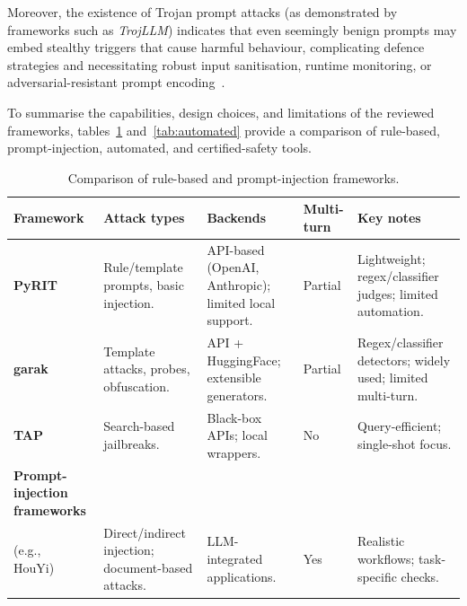 Moreover, the existence of Trojan prompt attacks (as demonstrated by frameworks such as {\em TrojLLM}) indicates that even seemingly benign prompts may embed stealthy triggers that cause harmful behaviour, complicating defence strategies and necessitating robust input sanitisation, runtime monitoring, or adversarial-resistant prompt encoding~\cite{xue2023trojllm}.

To summarise the capabilities, design choices, and limitations of the reviewed frameworks, tables~\ref{tab:rulebased} and~\ref{tab:automated} provide a comparison of rule-based, prompt-injection, automated, and certified-safety tools.

\begin{table}[H]
\centering
\scriptsize
\setlength{\extrarowheight}{2pt}
\begin{tabularx}{\linewidth}{l 
  >{\raggedright\arraybackslash}p{2.8cm} 
  >{\raggedright\arraybackslash}p{2.6cm} 
  >{\centering\arraybackslash}p{1.2cm} 
  >{\raggedright\arraybackslash}p{2.8cm}}
\toprule
\textbf{Framework} & \textbf{Attack types} & \textbf{Backends} & \textbf{Multi-turn} & \textbf{Key notes} \\
\midrule
\textbf{PyRIT}~\cite{munoz2024pyrit} &
Rule/template prompts, basic injection. &
API-based (OpenAI, Anthropic); limited local support. &
Partial &
Lightweight; regex/classifier judges; limited automation. \\
\addlinespace[2pt]

\textbf{garak}~\cite{derczynski2024garak} &
Template attacks, probes, obfuscation. &
API + HuggingFace; extensible generators. &
Partial &
Regex/classifier detectors; widely used; limited multi-turn. \\
\addlinespace[2pt]

\textbf{TAP}~\cite{mehrotra2024tap} &
Search-based jailbreaks. &
Black-box APIs; local wrappers. &
No &
Query-efficient; single-shot focus. \\
\addlinespace[2pt]

\textbf{Prompt-injection frameworks} \\ (e.g., HouYi)~\cite{liu2024promptinjection} &
Direct/indirect injection; document-based attacks. &
LLM-integrated applications. &
Yes &
Realistic workflows; task-specific checks. \\
\bottomrule
\end{tabularx}
\caption{Comparison of rule-based and prompt-injection frameworks.}
\label{tab:rulebased}
\end{table}

